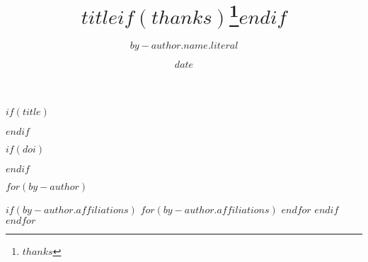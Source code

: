 $if(title)$
\title{$title$$if(thanks)$\thanks{$thanks$}$endif$}
$endif$

$if(doi)$
\usepackage{etoolbox}
\makeatletter
\providecommand{\doi}[1]{%
  \apptocmd{\@title}{\par {\large \url{#1} \par}}{}{}
}
\makeatother
\doi{$doi$}
$endif$

$for(by-author)$
  \author{$by-author.name.literal$}
  $if(by-author.affiliations)$
    $for(by-author.affiliations)$
    $endfor$
  $endif$
$endfor$

\date{$date$}

